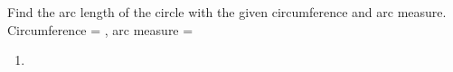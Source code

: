 Find the arc length of the circle with the given circumference and arc measure.
\newline
Circumference = , arc measure = \degree
\newline
\begin{enumerate}
    \item
\end{enumerate}
